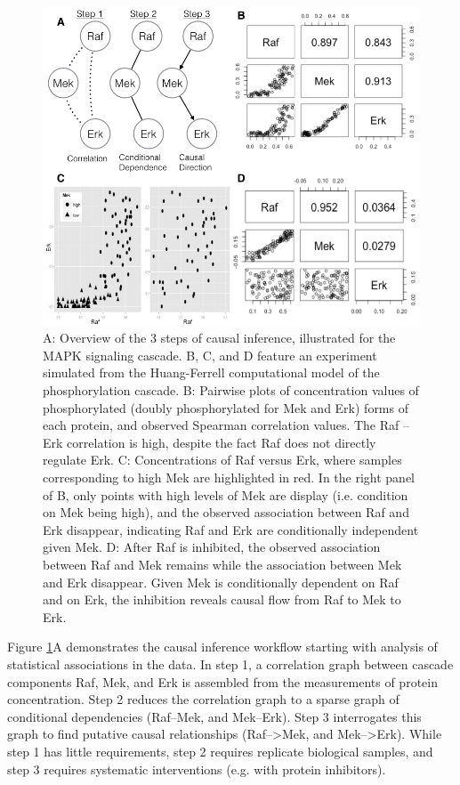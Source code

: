 \documentclass[journal=jacsat,manuscript=article]{achemso}
\begin{document}
\begin{figure}[!tpb]
\centerline{\includegraphics[width=1\textwidth]{figs/mapk.png}}
\caption{A: Overview of the 3 steps of causal inference, illustrated for the MAPK signaling cascade.    B, C, and D feature an experiment simulated from the Huang-Ferrell computational model of the phosphorylation cascade.  B: Pairwise plots of concentration values of phosphorylated (doubly phosphorylated for Mek and Erk) forms of each protein, and observed Spearman correlation values.  The Raf -- Erk correlation is high, despite the fact Raf does not directly regulate Erk.  C: Concentrations of Raf versus Erk, where samples corresponding to high Mek are highlighted in red.  In the right panel of B, only points with high levels of Mek are display (i.e. condition on Mek being high), and the observed association between Raf and Erk disappear, indicating Raf and Erk are conditionally independent given Mek.  D: After Raf is inhibited, the observed association between Raf and Mek remains while the association between Mek and Erk disappear.  Given Mek is conditionally dependent on Raf and on Erk, the inhibition reveals causal flow from Raf to Mek to Erk.}
\label{mapkInference}
\end{figure}


Figure \ref{mapkInference}A demonstrates the causal inference workflow starting with analysis of statistical associations in the data.  In step 1, a correlation graph between cascade components Raf, Mek, and Erk is assembled from the measurements of protein concentration.  Step 2 reduces the correlation graph to a sparse graph of conditional dependencies (Raf--Mek, and Mek--Erk).  Step 3 interrogates this graph to find putative causal relationships (Raf-->Mek, and Mek-->Erk).  While step 1 has little requirements, step 2 requires replicate biological samples, and step 3 requires systematic interventions (e.g. with protein inhibitors). 
\end{document}
